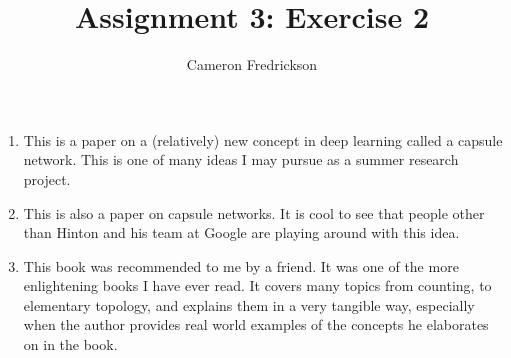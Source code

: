 \documentclass{article}
\title{Assignment 3: Exercise 2}
\author{Cameron Fredrickson}
\date{}
\begin{document}
\maketitle

\begin{enumerate}
    \item This is a paper on a (relatively) new concept in deep learning called a capsule network. This is one of many ideas I may pursue as a summer research project. \cite{46351}
    \item This is also a paper on capsule networks. It is cool to see that people other than Hinton and his team at Google are playing around with this idea.\cite{2017arXiv171203480X}
    \item This book was recommended to me by a friend. It was one of the more enlightening books I have ever read. It covers many topics from counting, to elementary topology, and explains them in a very tangible way, especially when the author provides real world examples of the concepts he elaborates on in the book. \cite{strogatz2012joy}
\end{enumerate}



\end{document}
